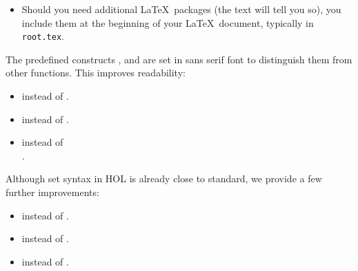\begin{isabellebody}
\begin{isamarkuptext}
\begin{itemize}
\item Should you need additional \LaTeX\ packages (the text will tell
you so), you include them at the beginning of your \LaTeX\ document,
typically in \texttt{root.tex}.
\end{itemize}%
\end{isamarkuptext}%
\isamarkuptrue%
%
\isamarkuptrue%
%
\isamarkuptrue%
%
\begin{isamarkuptext}%
The predefined constructs ,  and
 are set in sans serif font to distinguish them from
other functions. This improves readability:
\begin{itemize}
\item {} instead of .
\item {} instead of .
\item {} instead of\\
      .
\end{itemize}%
\end{isamarkuptext}%
\isamarkuptrue%
%
\isamarkuptrue%
%
\begin{isamarkuptext}%
Although set syntax in HOL is already close to
standard, we provide a few further improvements:
\begin{itemize}
\item {} instead of .
\item \isa{{\isasymemptyset}} instead of \isa{{\isacharbraceleft}{\isacharbraceright}}.
\item {} instead of .

\end{itemize}
\end{isamarkuptext}
\end{isabellebody}
